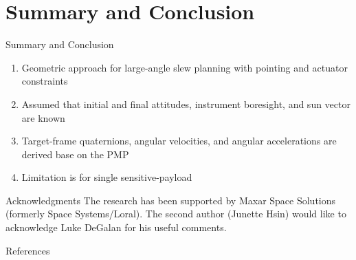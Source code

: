 \documentclass{beamer}
\begin{document}
\section{Summary and Conclusion}
\begin{frame}{Summary and Conclusion}
	\begin{enumerate}
		\item Geometric approach for large-angle slew planning with pointing and actuator constraints 
		\item Assumed that initial and final attitudes, instrument boresight, and sun vector are known 
		\item Target-frame quaternions, angular velocities, and angular accelerations are derived base on the PMP 
		\item Limitation is for single sensitive-payload 
	\end{enumerate}
	
	
\end{frame}
\begin{frame}{Acknowledgments}
	The research has been supported by Maxar Space Solutions (formerly Space Systems/Loral). The second author (Junette Hsin) would like to acknowledge Luke DeGalan for his useful comments. 
\end{frame}
\begin{frame}
\begin{block}{References}



\end{block}
\end{frame}
\end{document}
